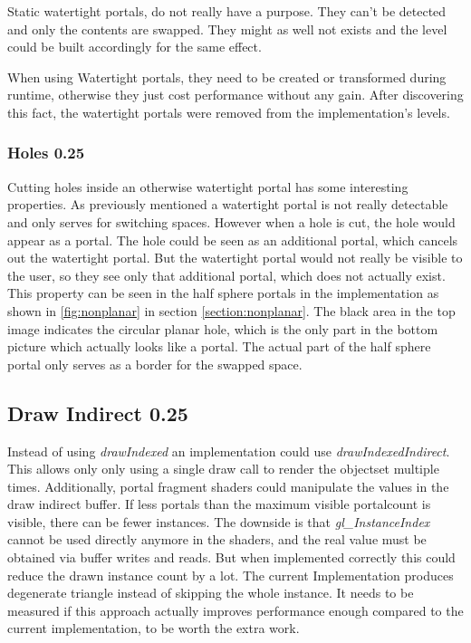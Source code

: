 Static watertight portals, do not really have a purpose. They can't be detected and only the contents are swapped. They might as well not exists and the level could be built accordingly for the same effect.

When using Watertight portals, they need to be created or transformed during runtime, otherwise they just cost performance without any gain. After discovering this fact, the watertight portals were removed from the implementation's levels.

\subsubsection{Holes 0.25}
Cutting holes inside an otherwise watertight portal has some interesting properties. As previously mentioned a watertight portal is not really detectable and only serves for switching spaces. However when a hole is cut, the hole would appear as a portal. The hole could be seen as an additional portal, which cancels out the watertight portal. But the watertight portal would not really be visible to the user, so they see only that additional portal, which does not actually exist. This property can be seen in the half sphere portals in the implementation as shown in \ref{fig:nonplanar} in section \ref{section:nonplanar}. The black area in the top image indicates the circular planar hole, which is the only part in the bottom picture which actually looks like a portal. The actual part of the half sphere portal only serves as a border for the swapped space.

\subsection{Draw Indirect 0.25}
Instead of using \textit{drawIndexed} an implementation could use \textit{drawIndexedIndirect}. This allows only only using a single draw call to render the \gls{objectset} multiple times. Additionally, portal fragment shaders could manipulate the values in the draw indirect buffer. If less portals than the maximum visible \gls{portalcount} is visible, there can be fewer instances. The downside is that \textit{gl\_InstanceIndex} cannot be used directly anymore in the shaders, and the real value must be obtained via buffer writes and reads. But when implemented correctly this could reduce the drawn instance count by a lot. The current Implementation produces degenerate triangle instead of skipping the whole instance. It needs to be measured if this approach actually improves performance enough compared to the current implementation, to be worth the extra work.


